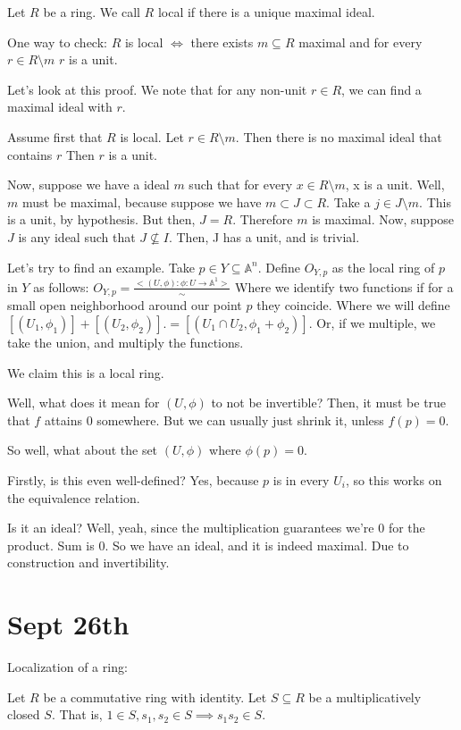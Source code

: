 \documentclass[10pt]{article}
\begin{document}
Let $R$ be a ring. We call $R$ local if there is a unique maximal ideal.

One way to check: $R$ is local $\iff$ there exists $m \subseteq R$ maximal and for every $r \in R \setminus m$ $r$ is a unit.

Let’s look at this proof. We note that for any non-unit $r \in R$, we can find a maximal ideal with $r$. 

Assume first that $R$ is local. Let $r \in R \setminus m$. Then there is no maximal ideal that contains $r$ Then $r$ is a unit.

Now, suppose we have a ideal $m$ such that for every $x \in R \setminus m$, x is a unit. Well, $m$ must be maximal, because suppose we have $m \subset J \subset R$. Take a $j \in J \setminus m$. This is a unit, by hypothesis. But then, $J = R$. Therefore $m$ is maximal. Now, suppose $J$ is any ideal such that $J \not \subseteq I$. Then, J has a unit, and is trivial. 

Let’s try to find an example. Take $p \in Y \subseteq \mathbb{A}^n$. Define $O_{Y,p}$ as the local ring of $p$ in $Y$ as follows: $O_{Y,p} = \frac{< (U,\phi) : \phi: U \to \mathbb{A}^1>}{\sim}$ Where we identify two functions if for a small open neighborhood around our point $p$ they coincide. Where we will define $[(U_1, \phi_1)] + [(U_2,\phi_2)].= [(U_1\cap U_2, \phi_1+\phi_2)]$. Or, if we multiple, we take the union, and multiply the functions.

We claim this is a local ring.

Well, what does it mean for $(U,\phi)$ to not be invertible? Then, it must be true that $f$ attains 0 somewhere. But we can usually just shrink it, unless $f(p) = 0$. 

So well, what about the set $(U,\phi)$ where $\phi(p) = 0$.

Firstly, is this even well-defined? Yes, because $p$ is in every $U_i$, so this works on the equivalence relation.

Is it an ideal? Well, yeah, since the multiplication guarantees we’re 0 for the product. Sum is 0. So we have an ideal, and it is indeed maximal. Due to construction and invertibility.

\section{Sept 26th}

Localization of a ring:

Let $R$ be a commutative ring with identity. Let $S \subseteq R$ be a multiplicatively closed $S$. That is, $1 \in S, s_1, s_2 \in S \implies s_1 s_2 \in S$.
\end{document}

